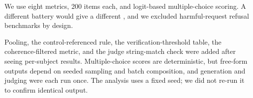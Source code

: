We use eight metrics, 200 items each, and logit-based multiple-choice scoring.
A different battery would give a different \fnr, and we excluded harmful-request refusal benchmarks by design.

Pooling, the control-referenced rule, the verification-threshold table, the coherence-filtered metric, and the judge string-match check were added after seeing per-subject results.
Multiple-choice scores are deterministic, but free-form outputs depend on seeded sampling and batch composition, and generation and judging were each run once.
The analysis uses a fixed seed; we did not re-run it to confirm identical output.
